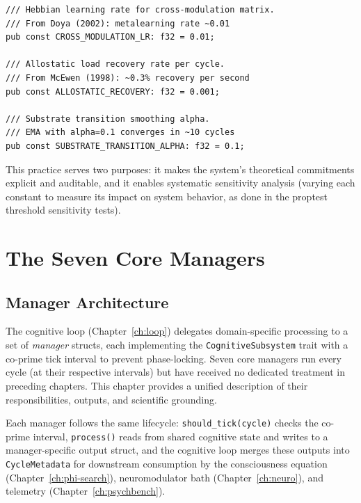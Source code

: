 \documentclass[12pt]{book}
\begin{document}
\begin{lstlisting}[caption={Named constants with scientific citations.},label=lst:thresholds]
/// Hebbian learning rate for cross-modulation matrix.
/// From Doya (2002): metalearning rate ~0.01
pub const CROSS_MODULATION_LR: f32 = 0.01;

/// Allostatic load recovery rate per cycle.
/// From McEwen (1998): ~0.3% recovery per second
pub const ALLOSTATIC_RECOVERY: f32 = 0.001;

/// Substrate transition smoothing alpha.
/// EMA with alpha=0.1 converges in ~10 cycles
pub const SUBSTRATE_TRANSITION_ALPHA: f32 = 0.1;
\end{lstlisting}

This practice serves two purposes: it makes the system's theoretical commitments explicit and auditable, and it enables systematic sensitivity analysis (varying each constant to measure its impact on system behavior, as done in the proptest threshold sensitivity tests).


\chapter{The Seven Core Managers}
\label{ch:managers}

\section{Manager Architecture}

The cognitive loop (Chapter~\ref{ch:loop}) delegates domain-specific processing to a set of \textit{manager} structs, each implementing the \texttt{CognitiveSubsystem} trait with a co-prime tick interval to prevent phase-locking. Seven core managers run every cycle (at their respective intervals) but have received no dedicated treatment in preceding chapters. This chapter provides a unified description of their responsibilities, outputs, and scientific grounding.

Each manager follows the same lifecycle: \texttt{should\_tick(cycle)} checks the co-prime interval, \texttt{process()} reads from shared cognitive state and writes to a manager-specific output struct, and the cognitive loop merges these outputs into \texttt{CycleMetadata} for downstream consumption by the consciousness equation (Chapter~\ref{ch:phi-search}), neuromodulator bath (Chapter~\ref{ch:neuro}), and telemetry (Chapter~\ref{ch:psychbench}).
\end{document}
